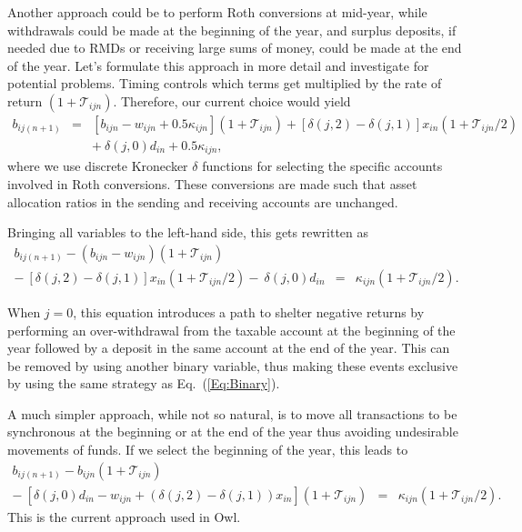 \documentclass{report}[fleqn,11pt]
\begin{document}
	Another approach could be to perform Roth conversions at mid-year, while withdrawals
	could be made at the beginning of the year, and surplus deposits,
	if needed due to RMDs or receiving large sums of money,
	could be made at the end of the year. Let's formulate this approach
	in more detail and investigate for potential problems.
	Timing controls which terms get multiplied by the rate of return $(1 + \mathcal{T}_{ijn})$.
	Therefore, our current choice would yield
	\begin{eqnarray}
		\label{Eq:C3a}
		b_{ij(n+1)} &=& [b_{ijn} - w_{ijn} + 0.5\kappa_{ijn}](1 + \mathcal{T}_{ijn})
		+ [\delta(j, 2) - \delta(j, 1)]x_{in} (1 + \mathcal{T}_{ijn}/2)
		\nonumber \\
		&& 
		+\ \delta(j, 0) d_{in} + 0.5 \kappa_{ijn},
	\end{eqnarray}
	where we use discrete Kronecker $\delta$ functions for selecting the specific accounts involved
	in Roth conversions. These conversions are made such that asset allocation
	ratios in the sending and receiving accounts are unchanged.

	Bringing all variables
	to the left-hand side, this gets rewritten as
	\begin{eqnarray}
		\label{Eq:C3}
		b_{ij(n+1)} - (b_{ijn} - w_{ijn}) (1 + \mathcal{T}_{ijn})
		&& \nonumber \\
		-\ [\delta(j, 2) - \delta(j, 1)]x_{in}(1 + \mathcal{T}_{ijn}/2)
		-\ \delta(j, 0) d_{in}
		&=& \kappa_{ijn} (1 + \mathcal{T}_{ijn}/2).
	\end{eqnarray}

	When $j=0$, this equation introduces
	a path to shelter negative returns by performing an over-withdrawal from the taxable
	account at the beginning of the year followed by a deposit in the
	same account at the end of the year. This can 
	be removed by using another binary variable, thus making these events exclusive by using
	the same strategy as Eq.~(\ref{Eq:Binary}).

	A much simpler approach, while not so natural,
	is to move all transactions to be synchronous at the beginning or at the end of the year
	thus avoiding undesirable movements of funds.
	If we select the beginning of the year, this leads to
	\begin{eqnarray}
		\label{Eq:C3b}
		b_{ij(n+1)} - b_{ijn}(1 + \mathcal{T}_{ijn}) 
		&& \nonumber \\
		- \ [\delta(j, 0)d_{in} - w_{ijn} + (\delta(j, 2) - \delta(j, 1))x_{in}] (1 + \mathcal{T}_{ijn})
		&=& \kappa_{ijn} (1 + \mathcal{T}_{ijn}/2).
	\end{eqnarray}
	This is the current approach used in Owl.
\end{document}
